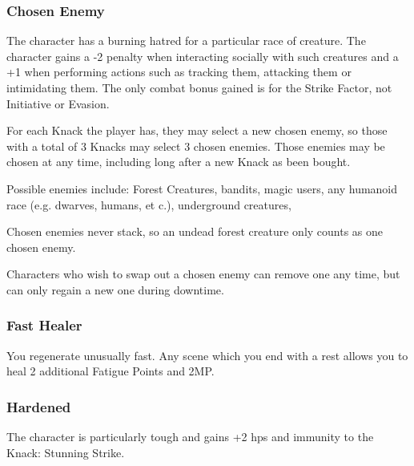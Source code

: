 \begin{multicols}{2}

\subsubsection{Chosen Enemy}

The character has a burning hatred for a particular race of creature.
The character gains a -2 penalty when interacting socially with such creatures and a +1 when performing actions such as tracking them, attacking them or intimidating them.
The only combat bonus gained is for the Strike Factor, not Initiative or Evasion.

For each Knack the player has, they may select a new chosen enemy, so those with a total of 3 Knacks may select 3 chosen enemies. Those enemies may be chosen at any time, including long after a new Knack as been bought.

Possible enemies include: Forest Creatures, bandits, magic users, any humanoid race (e.g. dwarves, humans, et c.), underground creatures, %
\iftoggle{aif}%
{undead, nura humanoids, and nura beasts.%
\footnote{See Adventures in Fenestra, \autoref{nura}.}}%
{and undead.}%

Chosen enemies never stack, so an undead forest creature only counts as one chosen enemy.

Characters who wish to swap out a chosen enemy can remove one any time, but can only regain a new one during downtime.

\subsubsection{Fast Healer}

You regenerate unusually fast. Any scene which you end with a rest allows you to heal 2 additional Fatigue Points and 2MP.

\subsubsection{Hardened}

The character is particularly tough and gains +2 \glspl{hp} and immunity to the Knack: Stunning Strike.

\end{multicols}

